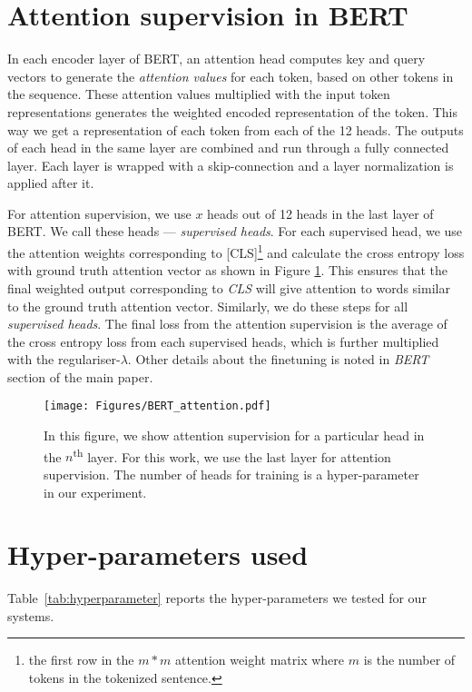 \documentclass[letterpaper]{article} \usepackage{aaai21}  \usepackage{times}  \usepackage{helvet} \usepackage{courier}  \usepackage[hyphens]{url}  \usepackage{graphicx} \urlstyle{rm} \def\UrlFont{\rm}  \usepackage{natbib}  \usepackage{caption}
\begin{document}
\section{Attention supervision in BERT}

In each encoder layer of BERT, an attention head computes key and query vectors to generate the \textit{attention values} for each token, based on other tokens in the sequence.  These attention values multiplied with the input token representations generates the weighted encoded representation of the token. This way we get a representation of each token from each of the 12 heads. The outputs of each head in the same layer are combined and run through a fully connected layer. Each layer is wrapped with a skip-connection and a layer normalization is applied after it. 

For attention supervision, we use $x$ heads out of 12 heads in the last layer of BERT. We call these heads --- \textit{supervised heads}. For each supervised head, we use the attention weights corresponding to [CLS]\footnote{the first row in the $m*m$ attention weight matrix where $m$ is the number of tokens in the tokenized sentence.} and calculate the cross entropy loss with ground truth attention vector as shown in Figure \ref{fig:bert_supervised}. This ensures that the final weighted output corresponding to \textit{CLS} will give attention to words similar to the ground truth attention vector. Similarly, we do these steps for all \textit{supervised heads}. The final loss from the attention supervision is the average of the cross entropy loss from each supervised heads, which is further multiplied with the regulariser-$\lambda$. Other details about the finetuning is noted in \textit{BERT} section of the main paper.

\begin{figure}[!tbh]
 \texttt{[image: Figures/BERT\_attention.pdf]}
 \caption{In this figure, we show attention supervision for a particular head in the $n$\textsuperscript{th} layer. For this work, we use the last layer for attention supervision. The number of heads for training is a hyper-parameter in our experiment.} 
 \label{fig:bert_supervised}
\end{figure}


\section{Hyper-parameters used}

Table~\ref{tab:hyperparameter} reports the hyper-parameters we tested for our systems.
\end{document}
